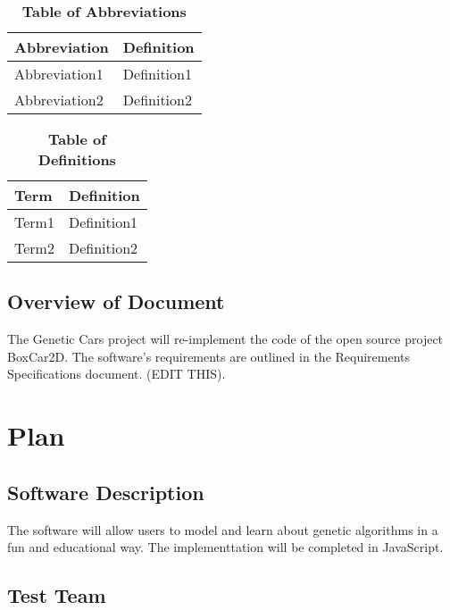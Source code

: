 \documentclass[12pt, titlepage]{article}
\begin{document}
\begin{table}[hbp]
\caption{\textbf{Table of Abbreviations}} \label{Table}

\begin{tabularx}{\textwidth}{p{3cm}X}
\toprule
\textbf{Abbreviation} & \textbf{Definition} \\
\midrule
Abbreviation1 & Definition1\\
Abbreviation2 & Definition2\\
\bottomrule
\end{tabularx}

\end{table}

\begin{table}[!htbp]
\caption{\textbf{Table of Definitions}} \label{Table}

\begin{tabularx}{\textwidth}{p{3cm}X}
\toprule
\textbf{Term} & \textbf{Definition}\\
\midrule
Term1 & Definition1\\
Term2 & Definition2\\
\bottomrule
\end{tabularx}

\end{table}	

\subsection{Overview of Document}

The Genetic Cars project will re-implement the code of the open source project BoxCar2D. The software's requirements are outlined in the Requirements Specifications document. (EDIT THIS).

\section{Plan}
	
\subsection{Software Description}

The software will allow users to model and learn about genetic algorithms in a fun and educational way. The implementtation will be completed in JavaScript.

\subsection{Test Team}
\end{document}

